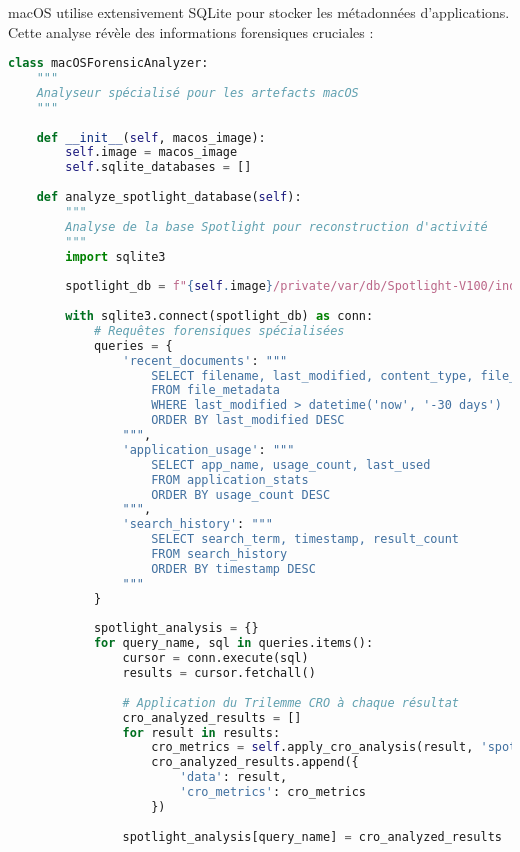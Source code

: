 macOS utilise extensivement SQLite pour stocker les métadonnées d'applications. Cette analyse révèle des informations forensiques cruciales :

\begin{lstlisting}[language=Python, caption=Analyseur SQLite macOS avec préservation d'intégrité]
class macOSForensicAnalyzer:
    """
    Analyseur spécialisé pour les artefacts macOS
    """
    
    def __init__(self, macos_image):
        self.image = macos_image
        self.sqlite_databases = []
        
    def analyze_spotlight_database(self):
        """
        Analyse de la base Spotlight pour reconstruction d'activité
        """
        import sqlite3
        
        spotlight_db = f"{self.image}/private/var/db/Spotlight-V100/index.sqlite"
        
        with sqlite3.connect(spotlight_db) as conn:
            # Requêtes forensiques spécialisées
            queries = {
                'recent_documents': """
                    SELECT filename, last_modified, content_type, file_size
                    FROM file_metadata 
                    WHERE last_modified > datetime('now', '-30 days')
                    ORDER BY last_modified DESC
                """,
                'application_usage': """
                    SELECT app_name, usage_count, last_used
                    FROM application_stats
                    ORDER BY usage_count DESC
                """,
                'search_history': """
                    SELECT search_term, timestamp, result_count
                    FROM search_history
                    ORDER BY timestamp DESC
                """
            }
            
            spotlight_analysis = {}
            for query_name, sql in queries.items():
                cursor = conn.execute(sql)
                results = cursor.fetchall()
                
                # Application du Trilemme CRO à chaque résultat
                cro_analyzed_results = []
                for result in results:
                    cro_metrics = self.apply_cro_analysis(result, 'spotlight')
                    cro_analyzed_results.append({
                        'data': result,
                        'cro_metrics': cro_metrics
                    })
                
                spotlight_analysis[query_name] = cro_analyzed_results
                

\end{lstlisting}
